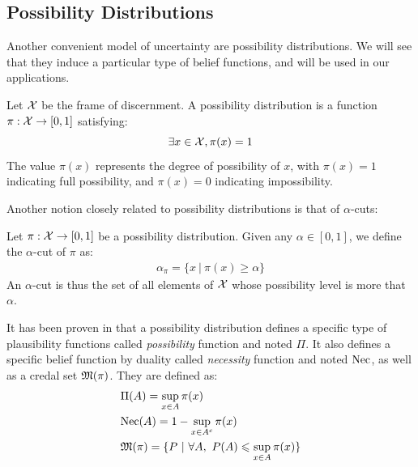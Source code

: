 \subsection{Possibility Distributions}\label{sec:possibilities}
Another convenient model of uncertainty are possibility distributions. We will see that they induce a particular type of belief functions, and will be used in our applications.

\begin{definition}\label{def:possibility}
    Let ${\mathcal{X}}$ be the frame of discernment. A possibility distribution is a function $\pi: {\mathcal{X}} \rightarrow [0,1]$ satisfying:
    \begin{equation}
    	\exists x \in {\mathcal{X}}, \pi(x) = 1 \label{eq:possibility}
    \end{equation}
    The value $\pi(x)$ represents the degree of possibility of $x$, with $\pi(x) = 1$ indicating full possibility, and $\pi(x) = 0$ indicating impossibility.
\end{definition}

Another notion closely related to possibility distributions is that of \(\alpha\)-cuts:
\begin{definition}\label{def:alpha_cut}
    Let $\pi: {\mathcal{X}} \rightarrow [0,1]$ be a possibility distribution. Given any \(\alpha\in[0,1]\), we define the \(\alpha\)-cut of \(\pi\) as:
    \begin{align}
        \alpha_\pi=\{x~|~\pi(x)\geqslant\alpha\} \label{eq:alpha_cut}   
    \end{align}
    An \(\alpha\)-cut is thus the set of all elements of ${\mathcal{X}}$ whose possibility level is more that $\alpha$.
\end{definition}

\begin{definition}
    It has been proven in \cite{dubois_when_1992} that a possibility distribution defines a specific type of plausibility functions called \textit{possibility} function and noted \(\Pi\). It also defines a specific belief function by duality called \textit{necessity} function and noted \({\mathrm{Nec}}\), as well as a credal set ${\mathfrak{M}}(\pi)$. They are defined as:
    \begin{align}
        &\Pi(A) = \sup_{x\in A}\pi(x)\\
        &{\mathrm{Nec}}(A)=1-\sup_{x\in A^c}\pi(x)\label{eq:bel_pl}\\
        &{\mathfrak{M}}(\pi)=\{P~|~\forall A,~P(A)\leqslant \sup_{x\in A}\pi(x)\}\label{eq:credal_set_possibility}
    \end{align}
\end{definition}

